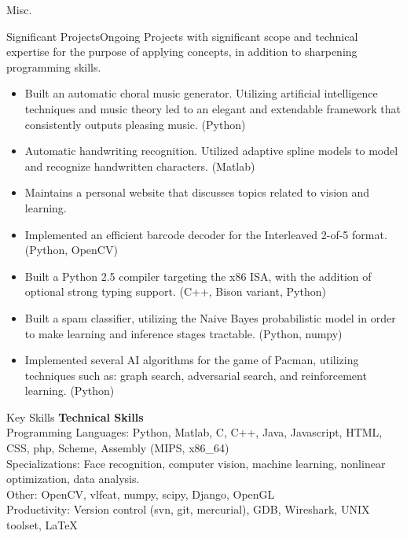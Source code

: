 \documentclass{resume}
\begin{document}
\begin{component}{Misc.}
	\begin{position}{Significant Projects}{Ongoing}
		{}{\vspace{-1.0em}}
	{Projects with significant scope and technical expertise for the purpose of applying concepts, in addition to
	sharpening programming skills.}

	\begin{itemize}
		\vspace{-0.5em}\item Built an automatic choral music generator. Utilizing artificial intelligence techniques and music theory led to an elegant and extendable framework that consistently outputs pleasing music.
		(Python)
        \vspace{-0.5em}\item Automatic handwriting recognition. Utilized adaptive spline models to model and recognize handwritten characters. (Matlab)
        \vspace{-0.5em}\item Maintains a personal website that discusses topics related to vision and learning.
        \vspace{-0.5em}\item Implemented an efficient barcode decoder
        for the Interleaved 2-of-5 format. (Python, OpenCV)
		\vspace{-0.5em}\item Built a Python 2.5 compiler targeting the x86 ISA, with the addition of
		optional strong typing support. (C++, Bison variant, Python)
		\vspace{-0.5em}\item Built a spam classifier, utilizing the Naive Bayes probabilistic model in order to make
		learning and inference stages tractable. (Python, numpy)
		\vspace{-0.5em}\item Implemented several AI algorithms for the game of Pacman, utilizing
		techniques such as: graph search, adversarial search, and reinforcement learning. (Python)
	\end{itemize}
	\end{position}
\end{component}

\vspace{-2.0em}

\begin{component}{Key Skills}
	\textbf{Technical Skills}\\
		Programming Languages: Python, Matlab, C, C++, Java, Javascript, HTML, CSS, php, Scheme, Assembly (MIPS, x86\_64)\\
        Specializations: Face recognition, computer vision, machine learning, nonlinear optimization, data analysis.\\
		Other: OpenCV, vlfeat, numpy, scipy, Django, OpenGL \\
		Productivity: Version control (svn, git, mercurial), GDB, Wireshark, UNIX toolset, LaTeX
\end{component}
\end{document}
